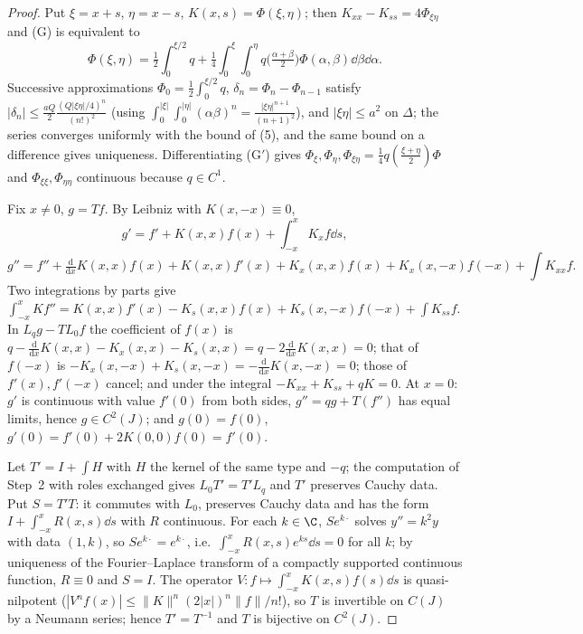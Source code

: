 \begin{proof}
Put $\xi=x+s$, $\eta=x-s$, $K(x,s)=\Phi(\xi,\eta)$; then $K_{xx}-K_{ss}=4\Phi_{\xi\eta}$ and (G) is equivalent to
\[
\Phi(\xi,\eta)=\tfrac12\int_0^{\xi/2}q+\tfrac14\int_0^\xi\!\!\int_0^\eta q\big(\tfrac{\alpha+\beta}2\big)\Phi(\alpha,\beta)\dd\beta\dd\alpha .\tag{G$'$}
\]
Successive approximations $\Phi_0=\frac12\int_0^{\xi/2}q$, $\delta_n=\Phi_n-\Phi_{n-1}$ satisfy $|\delta_n|\le\frac{aQ}2\frac{(Q|\xi\eta|/4)^n}{(n!)^2}$ (using $\int_0^{|\xi|}\!\int_0^{|\eta|}(\alpha\beta)^n=\frac{|\xi\eta|^{n+1}}{(n+1)^2}$), and $|\xi\eta|\le a^2$ on $\Delta$; the series converges uniformly with the bound of (5), and the same bound on a difference gives uniqueness. Differentiating (G$'$) gives $\Phi_\xi,\Phi_\eta,\Phi_{\xi\eta}=\frac14q(\frac{\xi+\eta}2)\Phi$ and $\Phi_{\xi\xi},\Phi_{\eta\eta}$ continuous because $q\in C^1$.

Fix $x\ne0$, $g=Tf$. By Leibniz with $K(x,-x)\equiv0$,
\[
g'=f'+K(x,x)f(x)+\int_{-x}^xK_xf\dd s,
\]
\[
g''=f''+\tfrac{\mathrm d}{\mathrm dx}K(x,x)f(x)+K(x,x)f'(x)+K_x(x,x)f(x)+K_x(x,-x)f(-x)+\int K_{xx}f .
\]
Two integrations by parts give $\int_{-x}^xKf''=K(x,x)f'(x)-K_s(x,x)f(x)+K_s(x,-x)f(-x)+\int K_{ss}f$. In $L_qg-TL_0f$ the coefficient of $f(x)$ is $q-\frac{\mathrm d}{\mathrm dx}K(x,x)-K_x(x,x)-K_s(x,x)=q-2\frac{\mathrm d}{\mathrm dx}K(x,x)=0$; that of $f(-x)$ is $-K_x(x,-x)+K_s(x,-x)=-\frac{\mathrm d}{\mathrm dx}K(x,-x)=0$; those of $f'(x),f'(-x)$ cancel; and under the integral $-K_{xx}+K_{ss}+qK=0$. At $x=0$: $g'$ is continuous with value $f'(0)$ from both sides, $g''=qg+T(f'')$ has equal limits, hence $g\in C^2(J)$; and $g(0)=f(0)$, $g'(0)=f'(0)+2K(0,0)f(0)=f'(0)$.

Let $T'=I+\int H$ with $H$ the kernel of the same type and $-q$; the computation of Step~2 with roles exchanged gives $L_0T'=T'L_q$ and $T'$ preserves Cauchy data. Put $S=T'T$: it commutes with $L_0$, preserves Cauchy data and has the form $I+\int_{-x}^xR(x,s)\dd s$ with $R$ continuous. For each $k\in\C$, $Se^{k\cdot}$ solves $y''=k^2y$ with data $(1,k)$, so $Se^{k\cdot}=e^{k\cdot}$, i.e.\ $\int_{-x}^xR(x,s)e^{ks}\dd s=0$ for all $k$; by uniqueness of the Fourier--Laplace transform of a compactly supported continuous function, $R\equiv0$ and $S=I$. The operator $V:f\mapsto\int_{-x}^xK(x,s)f(s)\dd s$ is quasi-nilpotent ($|V^nf(x)|\le\|K\|^n(2|x|)^n\|f\|/n!$), so $T$ is invertible on $C(J)$ by a Neumann series; hence $T'=T^{-1}$ and $T$ is bijective on $C^2(J)$.


\end{proof}
